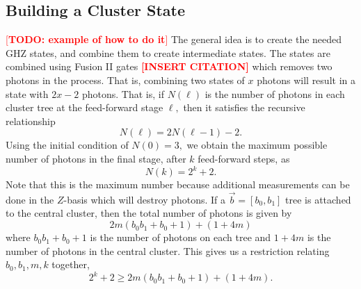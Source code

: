 \documentclass[%
 reprint,
 amsmath,amssymb
 aps,
]{revtex4}
\theoremstyle{remark}
\begin{document}
\subsection{Building a Cluster State}
\textcolor{red}{[\textbf{TODO: example of how to do it}]}
The general idea is to create the needed GHZ states, and combine them to create intermediate states. The states are combined using Fusion II gates \textcolor{red}{\textbf{[INSERT CITATION]}} which removes two photons in the process. That is, combining two states of $x$ photons will result in a state with $2x-2$ photons. That is, if $N(\ell)$ is the number of photons in each cluster tree at the feed-forward stage $\ell,$ then it satisfies the recursive relationship
\begin{equation}
    N(\ell) = 2N(\ell - 1) - 2.
\end{equation} 
Using the initial condition of $N(0)=3,$ we obtain the maximum possible number of photons in the final stage, after $k$ feed-forward steps, as
\begin{equation}
    N(k) = 2^k + 2.
\end{equation}
Note that this is the maximum number because additional measurements can be done in the $Z$-basis which will destroy photons. If a $\vec{b}=[b_0,b_1]$ tree is attached to the central cluster, then the total number of photons is given by 
\begin{equation}
    2m(b_0b_1+b_0+1)+(1+4m)
\end{equation} 
where $b_0b_1+b_0+1$ is the number of photons on each tree and $1+4m$ is the number of photons in the central cluster. This gives us a restriction relating $b_0,b_1,m,k$ together,
\begin{equation}
    2^k + 2 \ge 2m(b_0b_1+b_0+1)+(1+4m).
    \label{eq:kmb-relation}
\end{equation}
\end{document}
